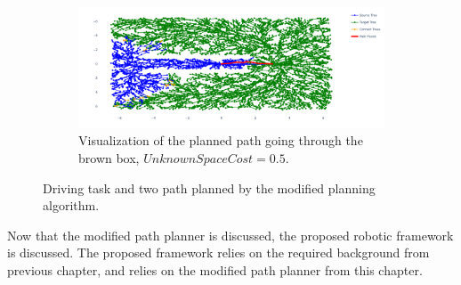 \begin{figure}[H]
    \begin{subfigure}{1.11\textwidth}
    \centering
    \includegraphics[width=\textwidth]{figures/required_background/mp/mp_low_fixed_cost}
    \caption{Visualization of the planned path going through the brown box, $\mathit{UnknownSpaceCost} = 0.5$.}
    \end{subfigure}
    \caption{Driving task and two path planned by the modified planning algorithm.}%
    \label{fig:mp_push_or_drive}
\end{figure}

Now that the modified path planner is discussed, the proposed robotic framework is discussed. The proposed framework relies on the required background from previous chapter, and relies on the modified path planner from this chapter.\bs








